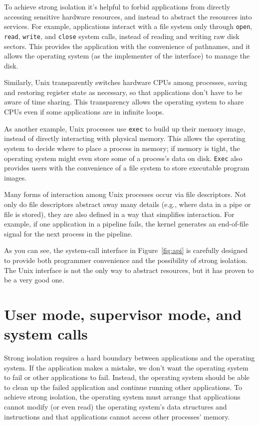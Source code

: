 To achieve strong isolation it's helpful to forbid applications from
directly accessing sensitive hardware resources, and instead to abstract the
resources into services.  For example, applications interact with a file system
only through
\lstinline{open},
\lstinline{read},
\lstinline{write}, 
and
\lstinline{close}
system calls,
instead of reading and writing raw disk sectors. 
This provides the application with the convenience of pathnames, and it allows
the operating system (as the implementer of the interface) to manage the disk. 

Similarly, Unix transparently switches hardware CPUs among processes,
saving and restoring register state as necessary,
so that applications don't have to be
aware of time sharing.  This transparency allows the operating system to share
CPUs even if some applications are in infinite loops.

As another example, Unix processes use 
\lstinline{exec}
to build up their memory image, instead of directly interacting with physical
memory.  This allows the operating system to decide where to place a process in
memory; if memory is tight, the operating system might even store some of
a process's data on disk.
\lstinline{Exec}
also provides
users with the convenience of a file system to store executable program images.  

Many forms of interaction among Unix processes occur via file descriptors.
Not only do file descriptors abstract away many details (e.g.,
where data in a pipe or file is stored), they are also defined in a
way that simplifies interaction.
For example, if one application in a pipeline fails, the kernel
generates an end-of-file signal for the next process in the pipeline.

As you can see, the system-call interface in
Figure~\ref{fig:api}
is carefully designed to provide both programmer convenience and
the possibility of strong isolation.  The Unix interface
is not the only way to abstract resources, but it has proven to be a very good
one.

\section{User mode, supervisor mode, and system calls}

Strong isolation requires a hard boundary between applications and the operating
system.  If the application makes a mistake, we don't want the operating system
to fail or other applications to fail. Instead, the operating system should be
able to clean up the failed application and continue running other applications.
To achieve strong isolation, the operating system must arrange that applications cannot modify (or even
read) the operating system's data structures and instructions and that
applications cannot access other processes' memory.


